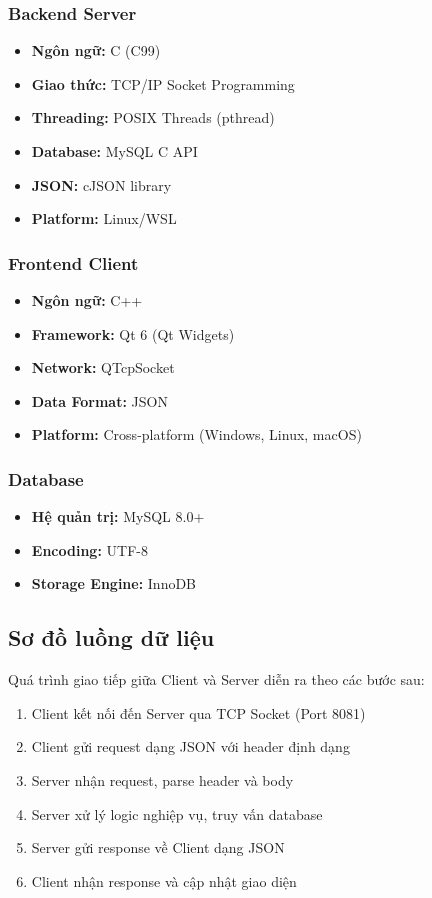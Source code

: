 ﻿\documentclass[12pt,a4paper]{report}
\begin{document}
\subsubsection{Backend Server}
\begin{itemize}
    \item \textbf{Ngôn ngữ:} C (C99)
    \item \textbf{Giao thức:} TCP/IP Socket Programming
    \item \textbf{Threading:} POSIX Threads (pthread)
    \item \textbf{Database:} MySQL C API
    \item \textbf{JSON:} cJSON library
    \item \textbf{Platform:} Linux/WSL
\end{itemize}

\subsubsection{Frontend Client}
\begin{itemize}
    \item \textbf{Ngôn ngữ:} C++
    \item \textbf{Framework:} Qt 6 (Qt Widgets)
    \item \textbf{Network:} QTcpSocket
    \item \textbf{Data Format:} JSON
    \item \textbf{Platform:} Cross-platform (Windows, Linux, macOS)
\end{itemize}

\subsubsection{Database}
\begin{itemize}
    \item \textbf{Hệ quản trị:} MySQL 8.0+
    \item \textbf{Encoding:} UTF-8
    \item \textbf{Storage Engine:} InnoDB
\end{itemize}

\subsection{Sơ đồ luồng dữ liệu}

Quá trình giao tiếp giữa Client và Server diễn ra theo các bước sau:

\begin{enumerate}
    \item Client kết nối đến Server qua TCP Socket (Port 8081)
    \item Client gửi request dạng JSON với header định dạng
    \item Server nhận request, parse header và body
    \item Server xử lý logic nghiệp vụ, truy vấn database
    \item Server gửi response về Client dạng JSON
    \item Client nhận response và cập nhật giao diện
\end{enumerate}
\end{document}

